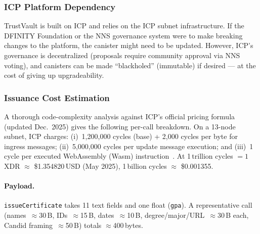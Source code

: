 \documentclass[journal]{IEEEtran}
\begin{document}
\subsubsection{ICP Platform Dependency}
TrustVault is built on ICP and relies on the ICP subnet infrastructure. If the DFINITY Foundation or the NNS governance system were to make breaking changes to the platform, the canister might need to be updated. However, ICP's governance is decentralized (proposals require community approval via NNS voting), and canisters can be made ``blackholed'' (immutable) if desired — at the cost of giving up upgradeability.

\subsubsection{Issuance Cost Estimation}
A thorough code-complexity analysis against ICP's official pricing formula~\cite{dfinity2025gascost} (updated Dec.\ 2025) gives the following per-call breakdown. On a 13-node subnet, ICP charges: (i)~1{,}200{,}000 cycles (base) + 2{,}000 cycles per byte for ingress messages; (ii)~5{,}000{,}000 cycles per update message execution; and (iii)~1 cycle per executed WebAssembly (Wasm) instruction~\cite{dfinity2025gascost}. At 1\,trillion cycles $= 1$\,XDR $\approx$ \$1.354820\,USD (May 2025), 1\,billion cycles $\approx$ \$0.001355.

\paragraph{Payload.}
\texttt{issueCertificate} takes 11 text fields and one float (\texttt{gpa}). A representative call (names~$\approx$30\,B, IDs~$\approx$15\,B, dates~$\approx$10\,B, degree/major/URL~$\approx$30\,B each, Candid framing~$\approx$50\,B) totals $\approx$400\,bytes.
\end{document}
